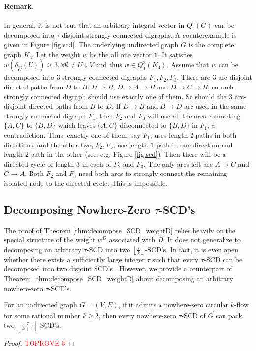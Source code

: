 \documentclass[runningheads]{llncs}
\newcommand{\rounddown}[1]{\left\lfloor#1\right\rfloor}
\begin{document}
\paragraph{Remark.} In general, it is not true that an arbitrary integral vector in $Q_1^\tau(G)$ can be decomposed into $\tau$ disjoint strongly connected digraphs. A counterexample is given in Figure \ref{fig:scd}. The underlying undirected graph $G$ is the complete graph $K_4$. Let the weight $w$ be the all one vector $\mathbf{1}$. It satisfies $w(\delta_{\vec{G}}(U))\geq 3, \forall \emptyset \neq U\subsetneqq V$ and thus $w\in Q_1^3(K_4)$. Assume that $w$ can be decomposed into $3$ strongly connected digraphs $F_1,F_2,F_3$. There are $3$ arc-disjoint directed paths from $D$ to $B$: $D\rightarrow B$, $D\rightarrow A\rightarrow B$ and $D\rightarrow C\rightarrow B$, so each strongly connected digraph should use exactly one of them. So should the $3$ arc-disjoint directed paths from $B$ to $D$. If $D\rightarrow B$ and $B\rightarrow D$ are used in the same strongly connected digraph $F_1$, then $F_2$ and $F_3$ will use all the arcs connecting $\{A,C\}$ to $\{B,D\}$ which leaves $\{A,C\}$ disconnected to $\{B,D\}$ in $F_1$, a contradiction. Thus, exactly one of them, say $F_1$, uses length $2$ paths in both directions, and the other two, $F_2,F_3$, use length $1$ path in one direction and length $2$ path in the other (see, e.g. Figure \ref{fig:scd}). Then there will be a directed cycle of length $3$ in each of $F_2$ and $F_3$. The only arcs left are $A\rightarrow C$ and $C\rightarrow A$. Both $F_2$ and $F_3$ need both arcs to strongly connect the remaining isolated node to the directed cycle. This is impossible. 



\subsection{Decomposing Nowhere-Zero $\tau$-SCD's}
The proof of Theorem \ref{thm:decompose_SCD_weightD} relies heavily on the special structure of the weight $w^D$ associated with $D$. It does not generalize to decomposing an arbitrary $\tau$-SCD into two $\rounddown{\frac{\tau}{k}}$-SCD's. In fact, it is even open whether there exists a sufficiently large integer $\tau$ such that every $\tau$-SCD can be decomposed into two disjoint SCD's \cite{bang2004decomposing}.   However, we provide a counterpart of Theorem~\ref{thm:decompose_SCD_weightD} about decomposing an arbitrary nowhere-zero $\tau$-SCD's.

\begin{theorem}\label{thm:decompose_SCD}
    For an undirected graph $G=(V,E)$, if it admits a nowhere-zero circular $k$-flow for some rational number $k\geq 2$, then every nowhere-zero $\tau$-SCD of $\vec{G}$ can pack two $\rounddown{\frac{\tau}{k+1}}$-SCD's.
\end{theorem}
    \begin{proof}\textcolor{red}{TOPROVE 8}\end{proof}
\end{document}
